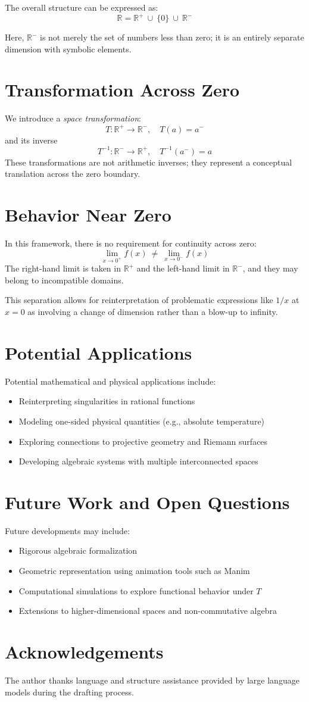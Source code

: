 \documentclass[12pt,a4paper]{article}
\begin{document}
The overall structure can be expressed as:
\[
    \mathbb{R} = \mathbb{R}^+ \ \cup\ \{0\} \ \cup\ \mathbb{R}^-
\]

Here, $\mathbb{R}^-$ is not merely the set of numbers less than zero; it is an entirely separate dimension with symbolic elements.

\section{Transformation Across Zero}
We introduce a \emph{space transformation}:
\[
    T: \mathbb{R}^+ \to \mathbb{R}^-, \quad T(a) = a^{-}
\]
and its inverse
\[
    T^{-1}: \mathbb{R}^- \to \mathbb{R}^+, \quad T^{-1}(a^{-}) = a
\]
These transformations are not arithmetic inverses; they represent a conceptual translation across the zero boundary.

\section{Behavior Near Zero}
In this framework, there is no requirement for continuity across zero:
\[
    \lim_{x \to 0^+} f(x) \ \neq \ \lim_{x \to 0^-} f(x)
\]
The right-hand limit is taken in $\mathbb{R}^+$ and the left-hand limit in $\mathbb{R}^-$, and they may belong to incompatible domains.

This separation allows for reinterpretation of problematic expressions like $1/x$ at $x = 0$ as involving a change of dimension rather than a blow-up to infinity.

\section{Potential Applications}
Potential mathematical and physical applications include:
\begin{itemize}
    \item Reinterpreting singularities in rational functions
    \item Modeling one-sided physical quantities (e.g., absolute temperature)
    \item Exploring connections to projective geometry and Riemann surfaces
    \item Developing algebraic systems with multiple interconnected spaces
\end{itemize}

\section{Future Work and Open Questions}
Future developments may include:
\begin{itemize}
    \item Rigorous algebraic formalization
    \item Geometric representation using animation tools such as Manim
    \item Computational simulations to explore functional behavior under $T$
    \item Extensions to higher-dimensional spaces and non-commutative algebra
\end{itemize}

\section*{Acknowledgements}
The author thanks language and structure assistance provided by large language models during the drafting process.
\end{document}

